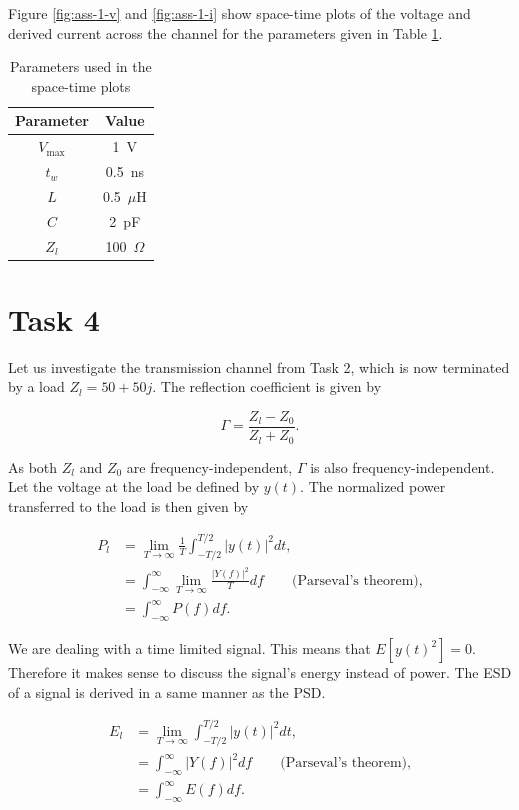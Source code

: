 \documentclass[11pt,titlepage]{report}
\begin{document}
Figure \ref{fig:ass-1-v} and \ref{fig:ass-1-i} show space-time plots of the voltage and derived current across the channel for the parameters given in Table \ref{tab:ass-1-parms}.

\begin{table}[H]
	\centering
	\caption{Parameters used in the space-time plots}
	\label{tab:ass-1-parms}
	\begin{tabular}{c c}
		\hline\hline
		Parameter & Value \\
		\hline
		$V_{\text{max}}$ & \SI{1}{V} \\
		$t_w$ & \SI{0.5}{ns} \\
		$L$ & \SI{0.5}{$\mu$H} \\
		$C$ & \SI{2}{pF} \\
		$Z_l$ & \SI{100}{$\Omega$} \\
		\hline
	\end{tabular}
\end{table}

\section{Task 4}
Let us investigate the transmission channel from Task 2, which is now terminated by a load $Z_l=50+50j$. The reflection coefficient is given by

\begin{equation}
	\Gamma = \frac{Z_l - Z_0}{Z_l + Z_0}.
\end{equation}

As both $Z_l$ and $Z_0$ are frequency-independent, $\Gamma$ is also frequency-independent. Let the voltage at the load be defined by $y(t)$. The normalized power transferred to the load is then given by

\begin{align}
	P_l &= \lim_{T \to \infty} \frac{1}{T} \int_{-T/2}^{T/2} |y(t)|^2 dt, \label{eq:ass-1-esd-lim} \\
	&= \int_{-\infty}^{\infty} \lim_{T \to \infty} \frac{|Y(f)|^2}{T} df \quad \quad \text{(Parseval's theorem),} \nonumber \\
	&= \int_{-\infty}^{\infty} P(f) df.
\end{align}

We are dealing with a time limited signal. This means that $E[y(t)^2]=0$. Therefore it makes sense to discuss the signal's energy instead of power. The ESD of a signal is derived in a same manner as the PSD.

\begin{align}
	E_l &= \lim_{T \to \infty} \int_{-T/2}^{T/2} |y(t)|^2 dt, \label{eq:ass-1-psd-lim} \\
	&= \int_{-\infty}^{\infty} |Y(f)|^2 df \quad \quad \text{(Parseval's theorem),} \nonumber \\
	&= \int_{-\infty}^{\infty} E(f) df.
\end{align}
\end{document}
